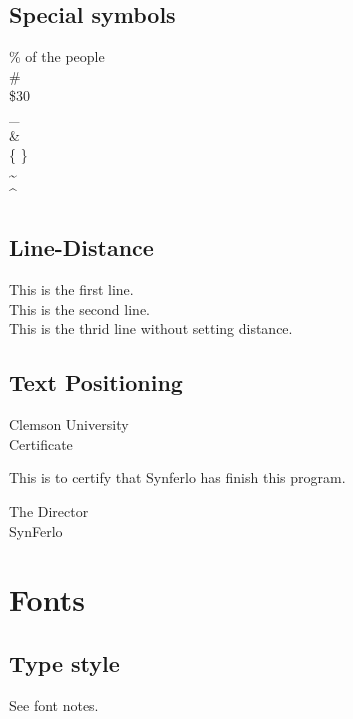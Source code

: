 \documentclass[12pt]{article}
\begin{document}
        \subsection{Special symbols}
             \% of the people\\
            \# \\
            \$30 \\
            \_ \\
            \& \\
            \{  \} \\
            \textasciitilde\\
            \textasciicircum

        
        \subsection{Line-Distance}
            This is the first line.\\[15pt]
            This is the second line.\\
            This is the thrid line without setting distance.

        
        \subsection{Text Positioning}
            \begin{center}
                Clemson University\\[.75cm]
                Certificate
            \end{center}
            
            \noindent This is to certify that Synferlo has finish this program.

            \begin{flushright}
                The Director\\
                SynFerlo
            \end{flushright}

    \section{Fonts}

        \subsection{Type style}
            See font notes.
        
\end{document}
